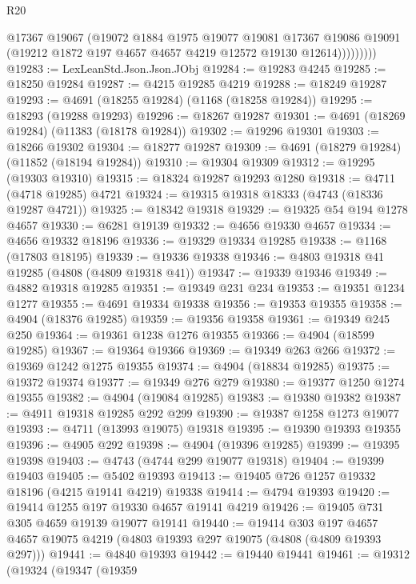 \begin{lexlean}{R20}
\begin{coremodule}
                  @17367
                  @19067
                  (@19072
                    @1884
                    @1975
                    @19077
                    @19081
                    @17367
                    @19086
                    @19091
                    (@19212 @1872 @197 @4657 @4657 @4219 @12572 @19130 @12614)))))))))
@19283 := LexLeanStd.Json.Json.JObj
@19284 := @19283 @4245
@19285 := @18250 @19284
@19287 := @4215 @19285 @4219
@19288 := @18249 @19287
@19293 := @4691 (@18255 @19284) (@1168 (@18258 @19284))
@19295 := @18293 (@19288 @19293)
@19296 := @18267 @19287
@19301 := @4691 (@18269 @19284) (@11383 (@18178 @19284))
@19302 := @19296 @19301
@19303 := @18266 @19302
@19304 := @18277 @19287
@19309 := @4691 (@18279 @19284) (@11852 (@18194 @19284))
@19310 := @19304 @19309
@19312 := @19295 (@19303 @19310)
@19315 := @18324 @19287 @19293 @1280
@19318 := @4711 (@4718 @19285) @4721
@19324 := @19315 @19318 @18333 (@4743 (@18336 @19287 @4721))
@19325 := @18342 @19318
@19329 := @19325 @54 @194 @1278 @4657
@19330 := @6281 @19139
@19332 := @4656 @19330 @4657
@19334 := @4656 @19332 @18196
@19336 := @19329 @19334 @19285
@19338 := @1168 (@17803 @18195)
@19339 := @19336 @19338
@19346 := @4803 @19318 @41 @19285 (@4808 (@4809 @19318 @41))
@19347 := @19339 @19346
@19349 := @4882 @19318 @19285
@19351 := @19349 @231 @234
@19353 := @19351 @1234 @1277
@19355 := @4691 @19334 @19338
@19356 := @19353 @19355
@19358 := @4904 (@18376 @19285)
@19359 := @19356 @19358
@19361 := @19349 @245 @250
@19364 := @19361 @1238 @1276 @19355
@19366 := @4904 (@18599 @19285)
@19367 := @19364 @19366
@19369 := @19349 @263 @266
@19372 := @19369 @1242 @1275 @19355
@19374 := @4904 (@18834 @19285)
@19375 := @19372 @19374
@19377 := @19349 @276 @279
@19380 := @19377 @1250 @1274 @19355
@19382 := @4904 (@19084 @19285)
@19383 := @19380 @19382
@19387 := @4911 @19318 @19285 @292 @299
@19390 := @19387 @1258 @1273 @19077
@19393 := @4711 (@13993 @19075) @19318
@19395 := @19390 @19393 @19355
@19396 := @4905 @292
@19398 := @4904 (@19396 @19285)
@19399 := @19395 @19398
@19403 := @4743 (@4744 @299 @19077 @19318)
@19404 := @19399 @19403
@19405 := @5402 @19393
@19413 := @19405 @726 @1257 @19332 @18196 (@4215 @19141 @4219) @19338
@19414 := @4794 @19393
@19420 := @19414 @1255 @197 @19330 @4657 @19141 @4219
@19426 := @19405 @731 @305 @4659 @19139 @19077 @19141
@19440 := @19414
    @303
    @197
    @4657
    @4657
    @19075
    @4219
    (@4803 @19393 @297 @19075 (@4808 (@4809 @19393 @297)))
@19441 := @4840 @19393
@19442 := @19440 @19441
@19461 := @19312
    (@19324
      (@19347
        (@19359

\end{coremodule}
\end{lexlean}
